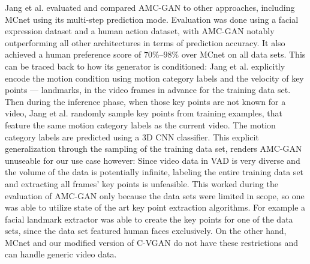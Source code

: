 Jang et al. evaluated and compared AMC-GAN to other approaches, including MCnet using its multi-step prediction mode. Evaluation was done using a facial expression dataset and a human action dataset, with AMC-GAN notably outperforming all other architectures in terms of prediction accuracy. It also achieved a human preference score of $70\%$--$98\%$ over MCnet on all data sets. This can be traced back to how its generator is conditioned: Jang et al. explicitly encode the motion condition using motion category labels and the velocity of key points --- landmarks, in the video frames in advance for the training data set. Then during the inference phase, when those key points are not known for a video, Jang et al. randomly sample key points from training examples, that feature the same motion category labels as the current video. The motion category labels are predicted using a 3D CNN classifier. This explicit generalization through the sampling of the training data set, renders AMC-GAN unuseable for our use case however: Since video data in VAD is very diverse and the volume of the data is potentially infinite, labeling the entire training data set and extracting all frames' key points is unfeasible. This worked during the evaluation of AMC-GAN only because the data sets were limited in scope, so one was able to utilize state of the art key point extraction algorithms. For example a facial landmark extractor was able to create the key points for one of the data sets, since the data set featured human faces exclusively. On the other hand, MCnet and our modified version of C-VGAN do not have these restrictions and can handle generic video data.

